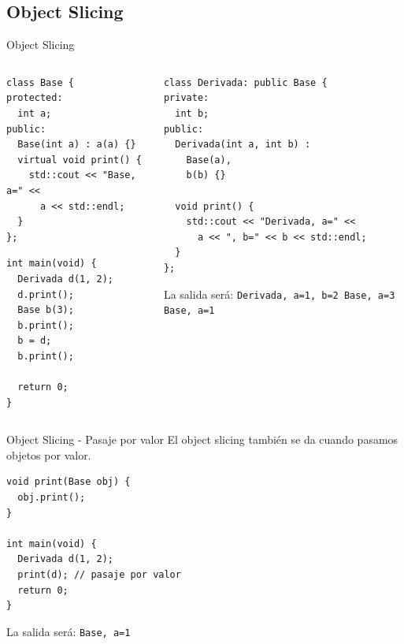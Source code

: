 \subsection{Object Slicing}
\begin{frame}{Object Slicing}{}
   \begin{columns}[t]
      \begin{column}{.5\linewidth}
         \begin{lstlisting}[style=normal,firstnumber=1]
class Base {
protected:
  int a;
public:
  Base(int a) : a(a) {}
  virtual void print() {
    std::cout << "Base, a=" <<
      a << std::endl;
  }
};

         \end{lstlisting}

         \begin{lstlisting}[style=normal,firstnumber=26]
int main(void) { 
  Derivada d(1, 2);
  d.print();
  Base b(3);
  b.print();
  b = d;
  b.print();

  return 0;
}

         \end{lstlisting}
      \end{column}
      \begin{column}{.5\linewidth}

         \begin{lstlisting}[style=normal,firstnumber=12]
class Derivada: public Base {
private:
  int b;
public:
  Derivada(int a, int b) : 
    Base(a),
    b(b) {}

  void print() {
    std::cout << "Derivada, a=" <<
      a << ", b=" << b << std::endl;
  }
};
         \end{lstlisting}

La salida ser\'a: \texttt{\newline Derivada, a=1, b=2 \newline Base, a=3 \newline Base, a=1}

      \end{column}
   \end{columns}
\end{frame}

\begin{frame}{Object Slicing - Pasaje por valor}{
  El object slicing tambi\'en se da cuando pasamos objetos por valor.
}
  \begin{lstlisting}[style=normal,firstnumber=26,linebackgroundcolor={%
                 \btLstHLR<1>{32}%
         }]
void print(Base obj) {
  obj.print();
}

int main(void) { 
  Derivada d(1, 2);
  print(d); // pasaje por valor
  return 0;
}

  \end{lstlisting}

La salida ser\'a: \texttt{\newline Base, a=1}
\end{frame}

